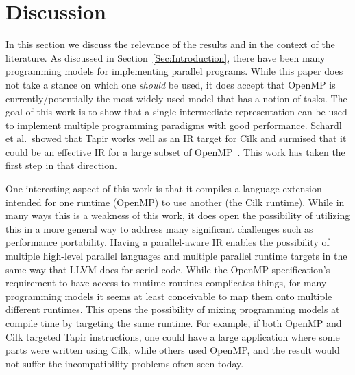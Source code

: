 \documentclass[sigconf]{acmart}
\begin{document}
\section{Discussion} \label{Sec:Discussion}

In this section we discuss the relevance of the results and in the context of the
literature. As discussed in Section~\ref{Sec:Introduction},
there have been many programming models for implementing parallel programs. While
this paper does not take a stance on which one \emph{should} be used, it does
accept that OpenMP is currently/potentially the most widely used model that has
a notion of tasks. The goal of this work is to show that a single intermediate
representation can be used to implement multiple programming paradigms with
good performance. Schardl et al.\ showed that Tapir works well as an IR target
for Cilk and surmised that it could be an effective IR for a large subset of
  OpenMP~\cite{tapir}. This work has taken the first step in that direction.

One interesting aspect of this work is that it compiles a language extension
intended for one runtime (OpenMP) to use another (the Cilk runtime). While in
many ways this is a weakness of this work, it does open the possibility of
utilizing this in a more general way to address many significant challenges
such as performance portability. Having a parallel-aware IR enables the
possibility of multiple high-level parallel languages and multiple parallel
runtime targets in the same way that LLVM does for serial code. While the
OpenMP specification's requirement to have access to runtime routines
complicates things, for many programming models it seems at least conceivable
to map them onto multiple different runtimes. This opens the possibility of
mixing programming models at compile time by targeting the same runtime. For
example, if both OpenMP and Cilk targeted Tapir instructions, one could have a
large application where some parts were written using Cilk, while others used
OpenMP, and the result would not suffer the incompatibility problems often
seen today.
\end{document}
